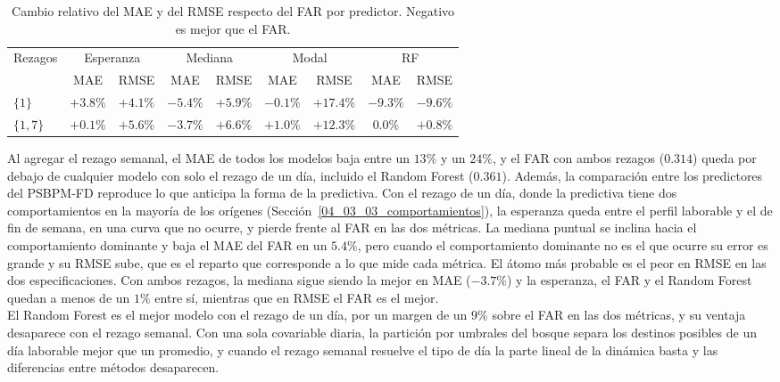 \begin{table}[H]
\centering\small
\setlength{\tabcolsep}{3.5pt}
\caption{Cambio relativo del MAE y del RMSE respecto del FAR por predictor. Negativo es mejor que el FAR.}
\label{tab:apl_bloqueA_ganancia}
\begin{tabular}{l cc cc cc cc}
\hline
Rezagos & \multicolumn{2}{c}{Esperanza} & \multicolumn{2}{c}{Mediana} & \multicolumn{2}{c}{Modal} & \multicolumn{2}{c}{RF} \\
 & MAE & RMSE & MAE & RMSE & MAE & RMSE & MAE & RMSE \\
\hline
$\{1\}$ & $+3.8\%$ & $+4.1\%$ & $-5.4\%$ & $+5.9\%$ & $-0.1\%$ & $+17.4\%$ & $-9.3\%$ & $-9.6\%$ \\
$\{1,7\}$ & $+0.1\%$ & $+5.6\%$ & $-3.7\%$ & $+6.6\%$ & $+1.0\%$ & $+12.3\%$ & $0.0\%$ & $+0.8\%$ \\
\hline
\end{tabular}
\end{table}
Al agregar el rezago semanal, el MAE de todos los modelos baja entre un $13\%$ y un $24\%$, y el FAR con ambos rezagos ($0.314$) queda por debajo de cualquier modelo con solo el rezago de un día, incluido el Random Forest ($0.361$). Además, la comparación entre los predictores del PSBPM-FD reproduce lo que anticipa la forma de la predictiva. Con el rezago de un día, donde la predictiva tiene dos comportamientos en la mayoría de los orígenes (Sección~\ref{04_03_03_comportamientos}), la esperanza queda entre el perfil laborable y el de fin de semana, en una curva que no ocurre, y pierde frente al FAR en las dos métricas. La mediana puntual se inclina hacia el comportamiento dominante y baja el MAE del FAR en un $5.4\%$, pero cuando el comportamiento dominante no es el que ocurre su error es grande y su RMSE sube, que es el reparto que corresponde a lo que mide cada métrica. El átomo más probable es el peor en RMSE en las dos especificaciones. Con ambos rezagos, la mediana sigue siendo la mejor en MAE ($-3.7\%$) y la esperanza, el FAR y el Random Forest quedan a menos de un $1\%$ entre sí, mientras que en RMSE el FAR es el mejor.\\

El Random Forest es el mejor modelo con el rezago de un día, por un margen de un $9\%$ sobre el FAR en las dos métricas, y su ventaja desaparece con el rezago semanal. Con una sola covariable diaria, la partición por umbrales del bosque separa los destinos posibles de un día laborable mejor que un promedio, y cuando el rezago semanal resuelve el tipo de día la parte lineal de la dinámica basta y las diferencias entre métodos desaparecen.

